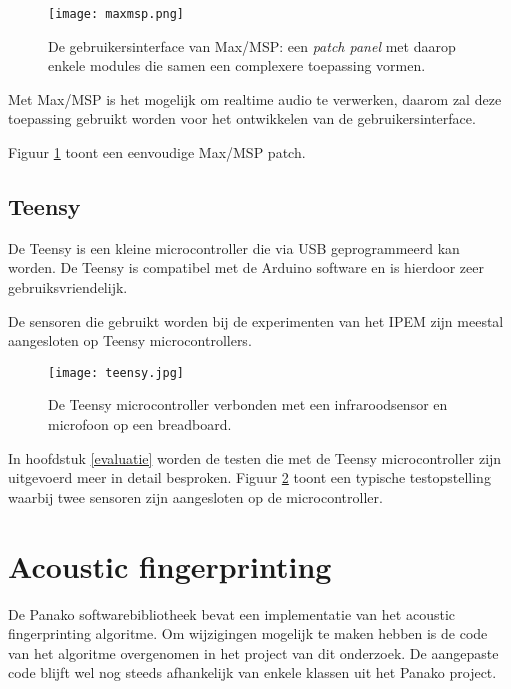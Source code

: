 \begin{figure}[!h]
	\captionsetup{width=0.8\textwidth}
	\caption[Gebruikersinterface van Max/MSP]{De gebruikersinterface van Max/MSP: een \textit{patch panel} met daarop enkele modules die samen een complexere toepassing vormen.}
	\centering
	\advance\parskip0.3cm
	\texttt{[image: maxmsp.png]}
	\label{screenshot-max}
\end{figure}

Met Max/MSP is het mogelijk om realtime audio te  verwerken, daarom zal deze toepassing gebruikt worden voor het ontwikkelen van de gebruikersinterface. 

Figuur \ref{screenshot-max} toont een eenvoudige Max/MSP patch.

\subsection{Teensy}

De Teensy is een kleine microcontroller die via USB geprogrammeerd kan worden. De Teensy is compatibel met de Arduino software en is hierdoor zeer gebruiksvriendelijk. \cite{teensy2016}

De sensoren die gebruikt worden bij de experimenten van het IPEM zijn meestal aangesloten op Teensy microcontrollers.

\begin{figure}[!h]
	\captionsetup{width=0.7\textwidth}
	\caption[Teensy microcontroller]{De Teensy microcontroller verbonden met een infraroodsensor en microfoon op een breadboard.}
	\centering
	\advance\parskip0.3cm
	\texttt{[image: teensy.jpg]}
	\label{teensy-pic}
\end{figure}

In hoofdstuk \ref{evaluatie} worden de testen die met de Teensy microcontroller zijn uitgevoerd meer in detail besproken. Figuur \ref{teensy-pic} toont een typische testopstelling waarbij twee sensoren zijn aangesloten op de microcontroller.

\section{Acoustic fingerprinting}

De Panako softwarebibliotheek bevat een implementatie van het acoustic fingerprinting algoritme. Om wijzigingen mogelijk te maken hebben is de code van het algoritme overgenomen in het project van dit onderzoek. De aangepaste code blijft wel nog steeds afhankelijk van enkele klassen uit het Panako project. 

